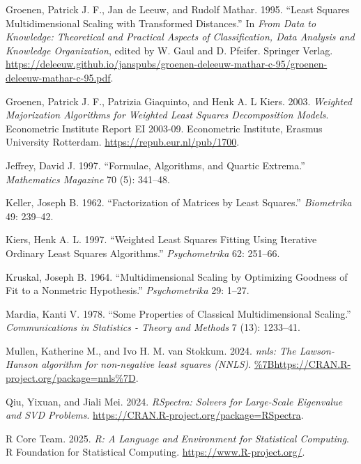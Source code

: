 \documentclass[
  12pt,
  letterpaper,
  DIV=11,
  numbers=noendperiod]{scrartcl}
\newlength{\cslhangindent}
\newenvironment{CSLReferences}[2] %
 {\begin{list}{}{%
  \setlength{\itemindent}{0pt}
  \setlength{\leftmargin}{0pt}
  \setlength{\parsep}{0pt}
  \ifodd #1
   \setlength{\leftmargin}{\cslhangindent}
   \setlength{\itemindent}{-1\cslhangindent}
  \fi
  \setlength{\itemsep}{#2\baselineskip}}}
 {\end{list}}
\begin{document}
\begin{CSLReferences}{1}{1}
{Groenen, Patrick J. F., Jan de Leeuw, and Rudolf Mathar}. 1995.
{``{Least Squares Multidimensional Scaling with Transformed
Distances}.''} In \emph{{From Data to Knowledge: Theoretical and
Practical Aspects of Classification, Data Analysis and Knowledge
Organization}}, edited by W. Gaul and D. Pfeifer. Springer Verlag.
\url{https://deleeuw.github.io/janspubs/groenen-deleeuw-mathar-c-95/groenen-deleeuw-mathar-c-95.pdf}.

Groenen, Patrick J. F., Patrizia Giaquinto, and Henk A. L Kiers. 2003.
\emph{{Weighted Majorization Algorithms for Weighted Least Squares
Decomposition Models}}. Econometric Institute Report EI 2003-09.
Econometric Institute, Erasmus University Rotterdam.
\url{https://repub.eur.nl/pub/1700}.

Jeffrey, David J. 1997. {``Formulae, Algorithms, and Quartic Extrema.''}
\emph{Mathematics Magazine} 70 (5): 341--48.

Keller, Joseph B. 1962. {``{Factorization of Matrices by Least
Squares}.''} \emph{Biometrika} 49: 239--42.

Kiers, Henk A. L. 1997. {``{Weighted Least Squares Fitting Using
Iterative Ordinary Least Squares Algorithms}.''} \emph{Psychometrika}
62: 251--66.

Kruskal, Joseph B. 1964. {``{Multidimensional Scaling by Optimizing
Goodness of Fit to a Nonmetric Hypothesis}.''} \emph{Psychometrika} 29:
1--27.

Mardia, Kanti V. 1978. {``Some Properties of Classical Multidimensional
Scaling.''} \emph{Communications in Statistics - Theory and Methods} 7
(13): 1233--41.

{Mullen, Katherine M., and Ivo H. M. van Stokkum}. 2024. \emph{{nnls:
The Lawson-Hanson algorithm for non-negative least squares (NNLS)}}.
\url{\%7Bhttps://CRAN.R-project.org/package=nnls\%7D}.

Qiu, Yixuan, and Jiali Mei. 2024. \emph{{RSpectra: Solvers for
Large-Scale Eigenvalue and SVD Problems}}.
\url{https://CRAN.R-project.org/package=RSpectra}.

R Core Team. 2025. \emph{R: A Language and Environment for Statistical
Computing}. R Foundation for Statistical Computing.
\url{https://www.R-project.org/}.


\end{CSLReferences}
\end{document}

